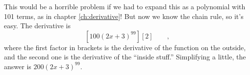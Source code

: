 This would be a horrible problem if we had to expand this as a polynomial with 101 terms,
as in chapter \ref{ch:derivative}! But now we know the chain rule, so it's easy. The derivative is
\begin{equation*}
  \left[100(2x+3)^{99}\right][2] \qquad ,
\end{equation*}
where the first factor in brackets is the derivative of the function on the outside, and
the second one is the derivative of the ``inside stuff.'' Simplifying a little, the
answer is $200(2x+3)^{99}$.
